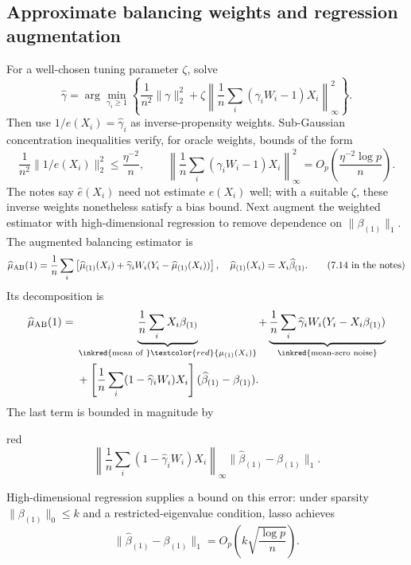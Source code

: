 \subsection{Approximate balancing weights and regression augmentation}
For a well-chosen tuning parameter $\zeta$, solve
\[
\widehat\gamma=\arg\min_{\gamma_i\geq1}
\left\{\frac1{n^2}\|\gamma\|_2^2+
\zeta\left\|\frac1n\sum_i(\gamma_iW_i-1)X_i\right\|_\infty^2\right\}.
\tag{7.12 in the notes}
\]
 Then use $1/\widehat e(X_i)=\widehat\gamma_i$ as inverse-propensity weights. Sub-Gaussian concentration inequalities verify, for oracle weights, bounds of the form
\[
\frac1{n^2}\|1/e(X_i)\|_2^2\leq\frac{\eta^{-2}}n,
\qquad
\left\|\frac1n\sum_i(\gamma_iW_i-1)X_i\right\|_\infty^2
=O_p\left(\frac{\eta^{-2}\log p}{n}\right).
\]
The notes say $\widehat e(X_i)$ need not estimate $e(X_i)$ well; with a suitable $\zeta$, these inverse weights nonetheless satisfy a bias bound.
Next augment the weighted estimator with high-dimensional regression to remove dependence on $\|\beta_{(1)}\|_1$. The augmented balancing estimator is
\[
\widehat\mu_{\rm AB}(1)=\frac1n\sum_i
\left[\widehat\mu_{(1)}(X_i)+\widehat\gamma_iW_i(Y_i-\widehat\mu_{(1)}(X_i))\right],
\quad\widehat\mu_{(1)}(X_i)=X_i\widehat\beta_{(1)}.
\tag{7.14 in the notes}
\]
Its decomposition is
\begin{align*}
\widehat\mu_{\rm AB}(1)={}&\underbrace{\frac1n\sum_iX_i\beta_{(1)}}_{\text{\inkred{mean of }}\textcolor{red}{\mu_{(1)}(X_i)}}
+\underbrace{\frac1n\sum_i\widehat\gamma_iW_i(Y_i-X_i\beta_{(1)})}_{\text{\inkred{mean-zero noise}}}\\
&+\left[\frac1n\sum_i(1-\widehat\gamma_iW_i)X_i\right](\widehat\beta_{(1)}-\beta_{(1)}).
\end{align*}
The last term is bounded in magnitude by
\begin{inkblock}{red}
\[
\left\|\frac1n\sum_i(1-\widehat\gamma_iW_i)X_i\right\|_\infty
\|\widehat\beta_{(1)}-\beta_{(1)}\|_1.
\]
\end{inkblock}
 High-dimensional regression supplies a bound on this error: under sparsity $\|\beta_{(1)}\|_0\leq k$ and a restricted-eigenvalue condition, lasso achieves
\[
\|\widehat\beta_{(1)}-\beta_{(1)}\|_1
=O_p\left(k\sqrt{\frac{\log p}{n}}\right).
\]
